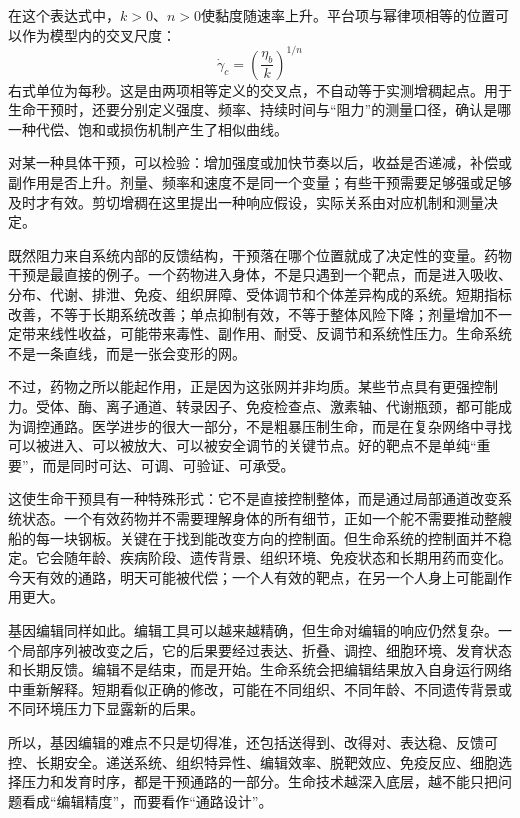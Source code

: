 在这个表达式中，$k>0$、$n>0$使黏度随速率上升。平台项与幂律项相等的位置可以作为模型内的交叉尺度：
\begin{equation}
\dot\gamma_c=\left(\frac{\eta_b}{k}\right)^{1/n}
\label{eq:ch28-gamma-c}
\end{equation}
右式单位为每秒。这是由两项相等定义的交叉点，不自动等于实测增稠起点。用于生命干预时，还要分别定义强度、频率、持续时间与“阻力”的测量口径，确认是哪一种代偿、饱和或损伤机制产生了相似曲线。

对某一种具体干预，可以检验：增加强度或加快节奏以后，收益是否递减，补偿或副作用是否上升。剂量、频率和速度不是同一个变量；有些干预需要足够强或足够及时才有效。剪切增稠在这里提出一种响应假设，实际关系由对应机制和测量决定。


既然阻力来自系统内部的反馈结构，干预落在哪个位置就成了决定性的变量。药物干预是最直接的例子。一个药物进入身体，不是只遇到一个靶点，而是进入吸收、分布、代谢、排泄、免疫、组织屏障、受体调节和个体差异构成的系统。短期指标改善，不等于长期系统改善；单点抑制有效，不等于整体风险下降；剂量增加不一定带来线性收益，可能带来毒性、副作用、耐受、反调节和系统性压力。生命系统不是一条直线，而是一张会变形的网。

不过，药物之所以能起作用，正是因为这张网并非均质。某些节点具有更强控制力。受体、酶、离子通道、转录因子、免疫检查点、激素轴、代谢瓶颈，都可能成为调控通路。医学进步的很大一部分，不是粗暴压制生命，而是在复杂网络中寻找可以被进入、可以被放大、可以被安全调节的关键节点。好的靶点不是单纯“重要”，而是同时可达、可调、可验证、可承受。

这使生命干预具有一种特殊形式：它不是直接控制整体，而是通过局部通道改变系统状态。一个有效药物并不需要理解身体的所有细节，正如一个舵不需要推动整艘船的每一块钢板。关键在于找到能改变方向的控制面。但生命系统的控制面并不稳定。它会随年龄、疾病阶段、遗传背景、组织环境、免疫状态和长期用药而变化。今天有效的通路，明天可能被代偿；一个人有效的靶点，在另一个人身上可能副作用更大。

基因编辑同样如此。编辑工具可以越来越精确，但生命对编辑的响应仍然复杂。一个局部序列被改变之后，它的后果要经过表达、折叠、调控、细胞环境、发育状态和长期反馈。编辑不是结束，而是开始。生命系统会把编辑结果放入自身运行网络中重新解释。短期看似正确的修改，可能在不同组织、不同年龄、不同遗传背景或不同环境压力下显露新的后果。

所以，基因编辑的难点不只是切得准，还包括送得到、改得对、表达稳、反馈可控、长期安全。递送系统、组织特异性、编辑效率、脱靶效应、免疫反应、细胞选择压力和发育时序，都是干预通路的一部分。生命技术越深入底层，越不能只把问题看成“编辑精度”，而要看作“通路设计”。

